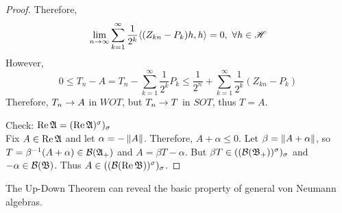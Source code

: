 \documentclass[a4paper,11pt]{report}
\begin{document}
\begin{proof}
	Therefore,
	\begin{equation*}
		\lim_{n \rightarrow \infty} \sum_{k=1}^{\infty} \frac{1}{2^k} \langle (Z_{kn}-P_k) h,h \rangle = 0,~ \forall h \in \mathscr{H}
	\end{equation*}
	However,
	\begin{equation*}
		0 \leqslant T_n - A = T_n - \sum_{k=1}^{\infty} \frac{1}{2^k} P_k \leqslant \frac{1}{2^n} + \sum_{k=1}^{\infty} \frac{1}{2^k}(Z_{kn}-P_k)
	\end{equation*}
	Therefore, $T_n \rightarrow A$ in $WOT$, but $T_n \rightarrow T$ in $SOT$, thus $T = A$. 
	\item Check: $\operatorname{Re}{\mathfrak{A}} = (\operatorname{Re}{\mathfrak{A}})^{\sigma})_{\sigma}$ \\
	Fix $A \in \operatorname{Re}{\mathfrak{A}}$ and let $\alpha = -\left\lVert A\right\lVert$.  Therefore, $A+\alpha \leqslant 0$. Let $\beta = \left\lVert A+\alpha\right\lVert$, so $T=\beta^{-1}(A+\alpha) \in \mathcal{B}(\mathfrak{A}_+)$ and $A = \beta T -\alpha$. But $\beta T \in ((\mathcal{B}(\mathfrak{B}_+))^{\sigma})_{\sigma}$  and $-\alpha \in \mathcal{B}(\mathfrak{B})$. Thus $A  \in ((\mathcal{B}(\operatorname{Re}{\mathfrak{B}}))^{\sigma})_{\sigma}$.
\end{proof}

The Up-Down Theorem can reveal the basic property of general von Neumann algebras.
\end{document}
